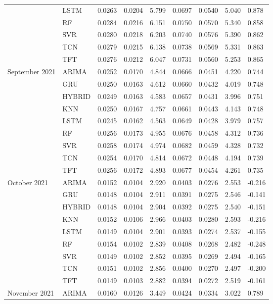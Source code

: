 \begin{tabular}{lllllllll}
 & LSTM & 0.0263 & 0.0204 & 5.799 & 0.0697 & 0.0540 & 5.040 & 0.878 \\
 & RF & 0.0284 & 0.0216 & 6.151 & 0.0750 & 0.0570 & 5.340 & 0.858 \\
 & SVR & 0.0280 & 0.0218 & 6.203 & 0.0740 & 0.0576 & 5.390 & 0.862 \\
 & TCN & 0.0279 & 0.0215 & 6.138 & 0.0738 & 0.0569 & 5.331 & 0.863 \\
 & TFT & 0.0276 & 0.0212 & 6.047 & 0.0731 & 0.0560 & 5.253 & 0.865 \\
September 2021 & ARIMA & 0.0252 & 0.0170 & 4.844 & 0.0666 & 0.0451 & 4.220 & 0.744 \\
 & GRU & 0.0250 & 0.0163 & 4.612 & 0.0660 & 0.0432 & 4.019 & 0.748 \\
 & HYBRID & 0.0249 & 0.0163 & 4.583 & 0.0657 & 0.0431 & 3.996 & 0.751 \\
 & KNN & 0.0250 & 0.0167 & 4.757 & 0.0661 & 0.0443 & 4.143 & 0.748 \\
 & LSTM & 0.0245 & 0.0162 & 4.563 & 0.0649 & 0.0428 & 3.979 & 0.757 \\
 & RF & 0.0256 & 0.0173 & 4.955 & 0.0676 & 0.0458 & 4.312 & 0.736 \\
 & SVR & 0.0258 & 0.0174 & 4.974 & 0.0682 & 0.0459 & 4.328 & 0.732 \\
 & TCN & 0.0254 & 0.0170 & 4.814 & 0.0672 & 0.0448 & 4.194 & 0.739 \\
 & TFT & 0.0256 & 0.0172 & 4.893 & 0.0677 & 0.0454 & 4.261 & 0.735 \\
October 2021 & ARIMA & 0.0152 & 0.0104 & 2.920 & 0.0403 & 0.0276 & 2.553 & -0.216 \\
 & GRU & 0.0148 & 0.0104 & 2.911 & 0.0391 & 0.0275 & 2.546 & -0.141 \\
 & HYBRID & 0.0148 & 0.0104 & 2.904 & 0.0392 & 0.0275 & 2.540 & -0.151 \\
 & KNN & 0.0152 & 0.0106 & 2.966 & 0.0403 & 0.0280 & 2.593 & -0.216 \\
 & LSTM & 0.0149 & 0.0104 & 2.901 & 0.0393 & 0.0274 & 2.537 & -0.155 \\
 & RF & 0.0154 & 0.0102 & 2.839 & 0.0408 & 0.0268 & 2.482 & -0.248 \\
 & SVR & 0.0149 & 0.0102 & 2.852 & 0.0395 & 0.0269 & 2.494 & -0.165 \\
 & TCN & 0.0151 & 0.0102 & 2.856 & 0.0400 & 0.0270 & 2.497 & -0.200 \\
 & TFT & 0.0149 & 0.0103 & 2.882 & 0.0394 & 0.0272 & 2.519 & -0.161 \\
November 2021 & ARIMA & 0.0160 & 0.0126 & 3.449 & 0.0424 & 0.0334 & 3.022 & 0.789 \\

\end{tabular}
